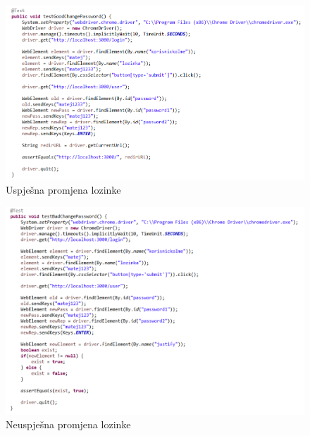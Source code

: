 			\begin{figure}[hp]
                    \centering
                    \includegraphics[width=15cm]{slike/koddobrapromjenalozinke.png}
                    \caption{Uspješna promjena lozinke}
                    \label{fig:useCase-2}
                \end{figure}
			\eject
			
			\begin{figure}[hp]
                    \centering
                    \includegraphics[width=15cm]{slike/kodlosapromjenalozinke.png}
                    \caption{Neuspješna promjena lozinke}
                    \label{fig:useCase-2}
                \end{figure}
			\eject
			
